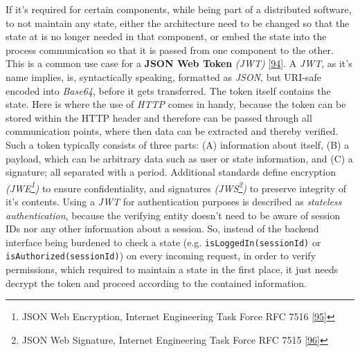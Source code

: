 \documentclass[12pt,english,a4paper,titlepage,cleardoublepage=empty,dottedtoc]{report}
\begin{document}
If it's required for certain components, while being part of a
distributed software, to not maintain any state, either the architecture
need to be changed so that the state at is no longer needed in that
component, or embed the state into the process communication so that it
is passed from one component to the other. This is a common use case for
a \textbf{\protect\hypertarget{link_jwt}{}{JSON Web Token}} \emph{(JWT)}
{[}\protect\hyperlink{ref-web_spec_json-web-token}{94}{]}. A \emph{JWT},
as it's name implies, is, syntactically speaking, formatted as
\emph{JSON}, but URI-safe encoded into \emph{Base64}, before it gets
transferred. The token itself contains the state. Here is where the use
of \emph{HTTP} comes in handy, because the token can be stored within
the HTTP header and therefore can be passed through all communication
points, where then data can be extracted and thereby verified. Such a
token typically consists of three parts: (A) information about itself,
(B) a payload, which can be arbitrary data such as user or state
information, and (C) a signature; all separated with a period.
Additional standards define encryption \emph{(JWE\footnote{JSON Web
  Encryption, Internet Engineering Task Force RFC 7516
  {[}\protect\hyperlink{ref-web_spec_json-web-encryption}{95}{]}})} to
ensure confidentiality, and signatures \emph{(JWS\footnote{JSON Web
  Signature, Internet Engineering Task Force RFC 7515
  {[}\protect\hyperlink{ref-web_spec_json-web-signature}{96}{]}})} to
preserve integrity of it's contents. Using a \emph{JWT} for
authentication purposes is described as \emph{stateless authentication},
because the verifying entity doesn't need to be aware of session IDs nor
any other information about a session. So, instead of the backend
interface being burdened to check a state (e.g.
\texttt{isLoggedIn(sessionId)} or \texttt{isAuthorized(sessionId)}) on
every incoming request, in order to verify permissions, which required
to maintain a state in the first place, it just needs decrypt the token
and proceed according to the contained information.
\end{document}
